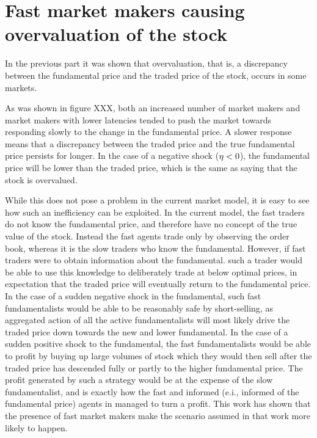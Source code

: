 \section{Fast market makers causing overvaluation of the stock}
In the previous part it was shown that overvaluation, that is, a discrepancy between the fundamental price and the traded price of the stock, occurs in some markets. 

As was shown in figure XXX, both an increased number of market makers and market makers with lower latencies tended to push the market towards responding slowly to the change in the fundamental price. A slower response means that a discrepancy between the traded price and the true fundamental price persists for longer. In the case of a negative shock ($\eta < 0$), the fundamental price will be lower than the traded price, which is the same as saying that the stock is overvalued.

While this does not pose a problem in the current market model, it is easy to see how such an inefficiency can be exploited. In the current model, the fast traders do not know the fundamental price, and therefore have no concept of the true value of the stock. Instead the fast agents trade only by observing the order book, whereas it is the slow traders who know the fundamental. However, if fast traders were to obtain information about the fundamental. such a trader would be able to use this knowledge to deliberately trade at below optimal prices, in expectation that the traded price will eventually return to the fundamental price. In the case of a sudden negative shock in the fundamental, such fast fundamentalists would be able to be reasonably safe by short-selling, as aggregated action of all the active fundamentalists will most likely drive the traded price down towards the new and lower fundamental. In the case of a sudden positive shock to the fundamental, the fast fundamentalists would be able to profit by buying up large volumes of stock which they would then sell after the traded price has descended fully or partly to the higher fundamental price. The profit generated by such a strategy would be at the expense of the slow fundamentalist, and is exactly how the fast and informed (e.i., informed of the fundamental price) agents in \cite{} managed to turn a profit. This work has shown that the presence of fast market makers make the scenario assumed in that work more likely to happen.

